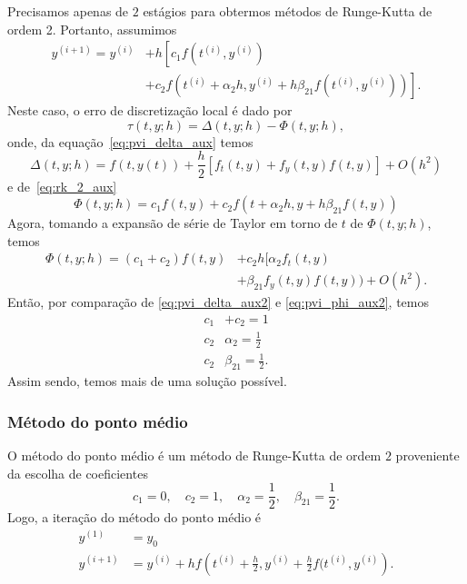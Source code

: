 Precisamos apenas de $2$ estágios para obtermos métodos de Runge-Kutta de ordem 2. Portanto, assumimos
\begin{align}
  y^{(i+1)} = y^{(i)} &+ h\left[c_1f(t^{(i)},y^{(i)}) \right.\nonumber\\
  &\left. + c_2f(t^{(i)}+\alpha_2h,y^{(i)}+h\beta_{21}f(t^{(i)},y^{(i)}))\right].\label{eq:rk_2_aux}
\end{align}
Neste caso, o erro de discretização local é dado por
\begin{equation}
  \tau(t,y;h) = \Delta(t,y;h) - \Phi(t,y;h),
\end{equation}
onde, da equação~\eqref{eq:pvi_delta_aux} temos
\begin{equation}\label{eq:pvi_delta_aux2}
  \Delta(t,y;h) = f(t,y(t)) + \frac{h}{2}[f_t(t,y) + f_y(t,y)f(t,y)] + O(h^2)
\end{equation}
e de~\eqref{eq:rk_2_aux}
\begin{equation}
  \Phi(t,y;h) = c_1f(t,y) + c_2f(t+\alpha_2h,y+h\beta_{21}f(t,y))
\end{equation}
Agora, tomando a expansão de série de Taylor em torno de $t$ de $\Phi(t,y;h)$, temos
\begin{align}\label{eq:pvi_phi_aux2}
  \Phi(t,y;h) = (c_1+c_2)f(t,y) &+ c_2h[\alpha_2f_t(t,y) \nonumber\\
  &+\beta_{21}f_y(t,y)f(t,y)) + O(h^2).
\end{align}
Então, por comparação de \eqref{eq:pvi_delta_aux2} e \eqref{eq:pvi_phi_aux2}, temos
\begin{align}
  c_1&+c_2 = 1\\
  c_2&\alpha_2 = \frac{1}{2}\\
  c_2&\beta_{21} = \frac{1}{2}.
\end{align}
Assim sendo, temos mais de uma solução possível.

\subsubsection{Método do ponto médio}

O método do ponto médio é um método de Runge-Kutta de ordem $2$ proveniente da escolha de coeficientes
\begin{equation}
  c_1 = 0, \quad c_2 = 1, \quad \alpha_2 = \frac{1}{2},\quad \beta_{21}=\frac{1}{2}.
\end{equation}
Logo, a iteração do método do ponto médio é
\begin{align}
  y^{(1)} &= y_0\\
  y^{(i+1)} &= y^{(i)} + hf\left(t^{(i)}+\frac{h}{2},y^{(i)}+\frac{h}{2}f(t^{(i)},y^{(i)}\right).
\end{align}

